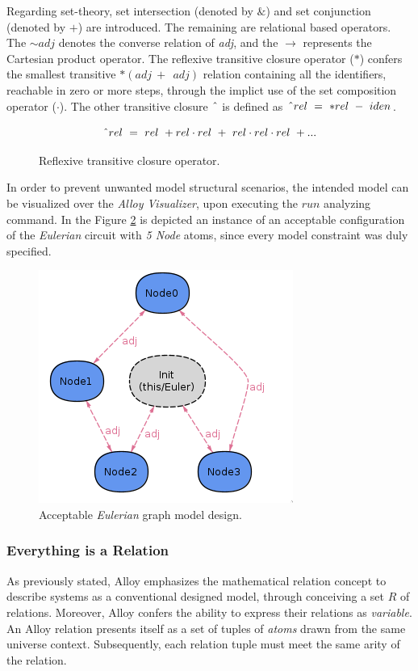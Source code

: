 Regarding set-theory, set intersection (denoted by $\&$) and set conjunction (denoted by $+$) are introduced. The remaining are relational based operators. The $\sim adj$ denotes the converse relation of \textit{adj}, and the $\rightarrow$ represents the Cartesian product operator. The reflexive transitive closure operator ($\ast$) confers the
smallest transitive $\ast(adj\ +\ ~adj)$ relation containing all the identifiers, reachable in zero or more steps, through the implict use of the set composition operator ($\cdot$). The other transitive closure $\string^$ is defined as $\string^ rel\ =\ \ast rel\ -\ iden$.

\begin{figure}[H]
    \[\string^ rel\ =\ rel\ + rel \cdot rel\ +\ rel \cdot rel \cdot rel\ + ... \]  
\caption{Reflexive transitive closure operator.}
\label{math:alloy-transitive}
\end{figure}

In order to prevent unwanted model structural scenarios, the intended model can be visualized over the \textit{Alloy Visualizer}, upon executing the $run$ analyzing command. In the Figure \ref{fig:alloy-eulerian_1} is depicted an instance of an acceptable configuration of the \textit{Eulerian} circuit with \textit{5 Node} atoms, since every model constraint was duly specified.

\begin{figure}[H]
    \centering
    \includegraphics[width=0.4\linewidth]{images/alloy_eulerian_1.png}
    \caption{Acceptable \textit{Eulerian} graph model design.}
    \label{fig:alloy-eulerian_1}
\end{figure}


\subsubsection{Everything is a Relation}

As previously stated, Alloy emphasizes the mathematical relation concept to describe systems as a conventional designed model, through conceiving a set $R$ of relations. Moreover, Alloy confers the ability to express their relations as \textit{variable}. \cite{lwspecification} An Alloy relation presents itself as a set of tuples of \textit{atoms} drawn from the same universe context. Subsequently, each relation tuple must meet the same arity of the relation. \cite{alloy-docs}


